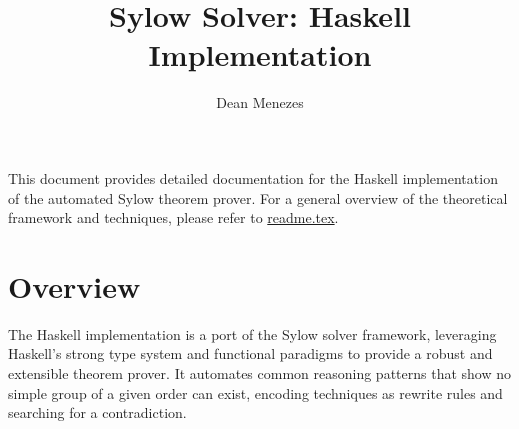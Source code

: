 \documentclass[11pt,oneside]{article}
\title{Sylow Solver: Haskell Implementation}
\author{Dean Menezes}
\date{}
\begin{document}
\maketitle

This document provides detailed documentation for the Haskell implementation of the automated Sylow theorem prover. For a general overview of the theoretical framework and techniques, please refer to \href{readme.tex}{readme.tex}.

\section{Overview}
The Haskell implementation is a port of the Sylow solver framework,
leveraging Haskell's strong type system and functional paradigms to
provide a robust and extensible theorem prover. It automates common
reasoning patterns that show no simple group of a given order can
exist, encoding techniques as rewrite rules and searching for a contradiction.
\end{document}
